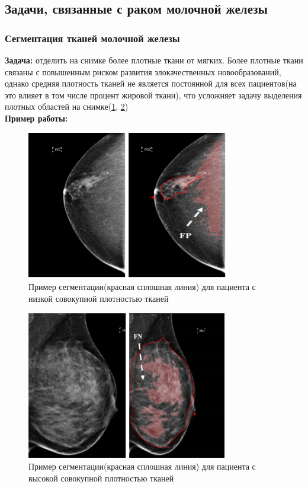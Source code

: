 \subsection{Задачи, связанные с раком молочной железы}

\subsubsection{Сегментация тканей молочной железы}
{\bf Задача:} отделить на снимке более плотные ткани от мягких. Более плотные ткани связаны с повышенным риском развития злокачественных новообразований, однако средняя плотность тканей не является постоянной для всех пациентов(на это влияет в том числе процент жировой ткани), что усложняет задачу выделения плотных областей на снимке(\ref{fig:breast_1r}, \ref{fig:breast_2})
\\
{\bf Пример работы:} \cite{breast_tissue}


\begin{figure}[h] 
  \center
  \includegraphics [scale=1.0] {images/breast_1.png}
  \caption{ Пример сегментации(красная сплошная линия) для пациента с низкой совокупной плотностью тканей\cite{breast_tissue}} 
  \label{fig:breast_1r}  
\end{figure}

\begin{figure}[!htb] 
  \center
  \includegraphics [scale=1.0] {images/breast_2.png}
  \caption{ Пример сегментации(красная сплошная линия) для пациента с высокой совокупной плотностью тканей\cite{breast_tissue}} 
  \label{fig:breast_2}  
\end{figure}
\
